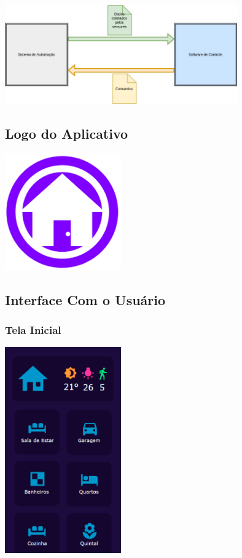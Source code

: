 \begin{center}
\includegraphics[width=10cm]{figuras/componentes}
\end{center}

\subsection{Logo do Aplicativo}

\begin{center}
\includegraphics[width=5cm]{figuras/pi1}
\end{center}

\subsection{Interface Com o Usuário}

\subsubsection{Tela Inicial}

\begin{center}
\includegraphics[width=5cm]{figuras/2}
\end{center}

